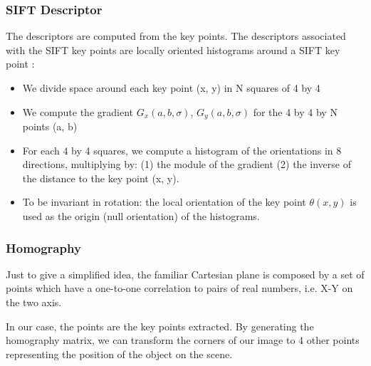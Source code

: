 	\subsubsection[Descriptor]{SIFT Descriptor}
	\par The descriptors are computed from the key points. The descriptors associated with the SIFT key points are locally oriented histograms around a SIFT key point \cite{AM}:
	
	\begin{itemize}
			\item We divide space around each key point (x, y) in N squares of 4 by 4 \item We compute the gradient \begin{math}G_{x}(a,b,\sigma)\end{math}, \begin{math}G_{y}(a,b,\sigma)\end{math} for the 4 by 4 by N points (a, b)

		\item For each 4 by 4 squares, we compute a histogram of the orientations in 8 directions, multiplying by: (1) the module of the gradient (2) the inverse of the distance to the key point (x, y).
 \item To be invariant in rotation: the local orientation of the key point \begin{math} \theta(x,y) \end{math} is used as the origin (null orientation) of the histograms.		
	\end{itemize}
	
	
	\subsubsection{Homography}
	\par  Just to give a simplified idea, the familiar Cartesian plane is composed by a set of points which have a one-to-one correlation to pairs of real numbers, i.e. X-Y on the two axis\cite{Homography}.
	\par In our case, the points are the key points extracted. By generating the homography matrix, we can transform the corners of our image to 4 other points representing the position of the object on the scene\cite{TutoHomography}.
	
